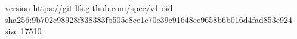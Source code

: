 version https://git-lfs.github.com/spec/v1
oid sha256:9b702c98928f838383fb505c8ce1c70e39c91648ee9658b6b016d4fad853e924
size 17510
